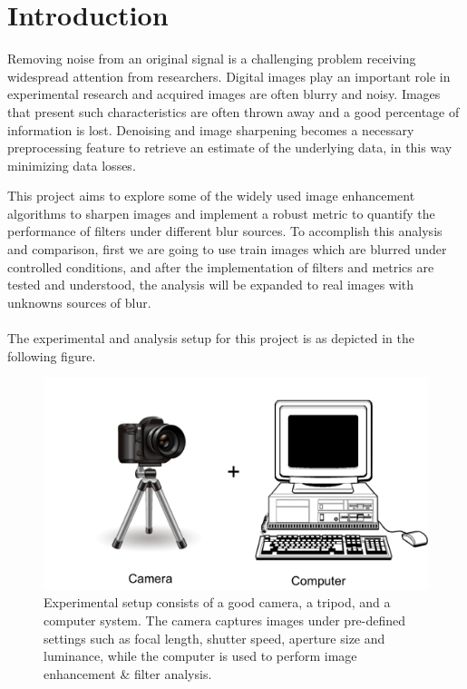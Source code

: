\graphicspath{{mehul_pics/}}%

\section{Introduction}
Removing noise from an original signal is a challenging problem receiving widespread attention from researchers. Digital images play an important role in experimental research and acquired images are often blurry and noisy. Images that present such characteristics are often thrown away and a good percentage of information is lost. Denoising and image sharpening becomes a necessary  preprocessing feature to retrieve an estimate of the underlying data, in this way minimizing data losses. 

This project aims to explore some of the widely used image enhancement algorithms to sharpen images and implement a robust metric to quantify the performance of filters under different blur sources. To accomplish this analysis and comparison, first we are going to use train images which are blurred under controlled conditions, and after the implementation of filters and metrics are tested and understood, the analysis will be expanded to real images with unknowns sources of blur.\\


\\
The experimental and analysis setup for this project is as depicted in the following figure.
\begin{figure}[h!]
  \centering
                \centering
                \includegraphics[width=.6\textwidth]{experimental_setup.png}
                \caption{Experimental setup consists of a good camera, a tripod, and a computer system. The camera captures images under pre-defined settings such as focal length, shutter speed, aperture size and luminance, while the computer is used to perform image enhancement \& filter analysis.}
\end{figure}

